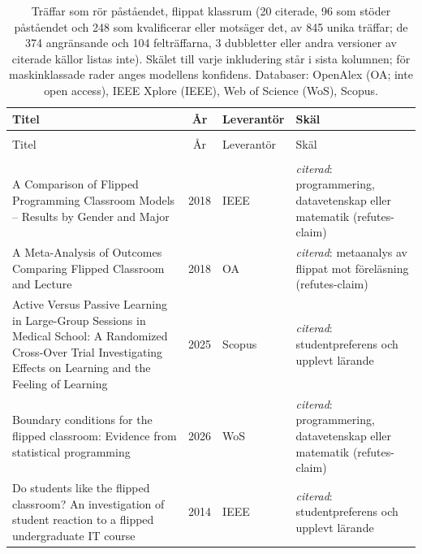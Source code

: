 
\begingroup\footnotesize
\begin{longtable}{@{}%
  >{\raggedright\arraybackslash}p{}c%
  >{\raggedright\arraybackslash}p{}%
  >{\raggedright\arraybackslash}p{}@{}}
\caption{Träffar som rör påståendet, flippat klassrum (20 citerade, 96 som stöder påståendet och 248 som kvalificerar eller motsäger det, av 845 unika träffar; de 374 angränsande och 104 felträffarna, 3 dubbletter eller andra versioner av citerade källor listas inte). Skälet till varje inkludering står i sista kolumnen; för maskinklassade rader anges modellens konfidens. Databaser: OpenAlex (OA; inte open access), IEEE Xplore (IEEE), Web of Science (WoS), Scopus.}\label{tab:flipped-traffar}\\
\toprule
Titel & År & Leverantör & Skäl \\
\midrule
\endfirsthead
\multicolumn{4}{@{}l}{\emph{\tablename~\thetable{} (forts.)}}\\
\toprule
Titel & År & Leverantör & Skäl \\
\midrule
\endhead
\midrule \multicolumn{4}{r@{}}{\emph{forts.\ på nästa sida}}\\
\endfoot
\bottomrule
\endlastfoot
A Comparison of Flipped Programming Classroom Models -- Results by Gender and Major & 2018 & IEEE & \emph{citerad}: programmering, datavetenskap eller matematik (refutes-claim) \\
A Meta-Analysis of Outcomes Comparing Flipped Classroom and Lecture & 2018 & OA & \emph{citerad}: metaanalys av flippat mot föreläsning (refutes-claim) \\
Active Versus Passive Learning in Large-Group Sessions in Medical School: A Randomized Cross-Over Trial Investigating Effects on Learning and the Feeling of Learning & 2025 & Scopus & \emph{citerad}: studentpreferens och upplevt lärande \\
Boundary conditions for the flipped classroom: Evidence from statistical programming & 2026 & WoS & \emph{citerad}: programmering, datavetenskap eller matematik (refutes-claim) \\
Do students like the flipped classroom? An investigation of student reaction to a flipped undergraduate IT course & 2014 & IEEE & \emph{citerad}: studentpreferens och upplevt lärande \\

\end{longtable}
